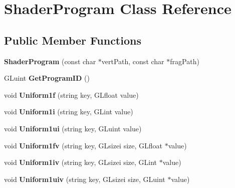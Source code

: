 \hypertarget{class_shader_program}{\section{Shader\-Program Class Reference}
\label{class_shader_program}
}
\subsection*{Public Member Functions}
\begin{DoxyCompactItemize}
\item 
\hypertarget{class_shader_program_af4e64768916420e8b1b25613cbfe87b2}{{\bfseries Shader\-Program} (const char $\ast$vert\-Path, const char $\ast$frag\-Path)}\label{class_shader_program_af4e64768916420e8b1b25613cbfe87b2}

\item 
\hypertarget{class_shader_program_aabcda45c2ffcbc9791b79a809ec07520}{G\-Luint {\bfseries Get\-Program\-I\-D} ()}\label{class_shader_program_aabcda45c2ffcbc9791b79a809ec07520}

\item 
\hypertarget{class_shader_program_abde4a0bc3be5e9417a11836133f7105c}{void {\bfseries Uniform1f} (string key, G\-Lfloat value)}\label{class_shader_program_abde4a0bc3be5e9417a11836133f7105c}

\item 
\hypertarget{class_shader_program_afc30088842f57ca6934a77b67d42d8e8}{void {\bfseries Uniform1i} (string key, G\-Lint value)}\label{class_shader_program_afc30088842f57ca6934a77b67d42d8e8}

\item 
\hypertarget{class_shader_program_ac34c7aaa86f1652b30745a9192724414}{void {\bfseries Uniform1ui} (string key, G\-Luint value)}\label{class_shader_program_ac34c7aaa86f1652b30745a9192724414}

\item 
\hypertarget{class_shader_program_a31956592c743f49f16c86fb79ba1e7e8}{void {\bfseries Uniform1fv} (string key, G\-Lsizei size, G\-Lfloat $\ast$value)}\label{class_shader_program_a31956592c743f49f16c86fb79ba1e7e8}

\item 
\hypertarget{class_shader_program_a9920358f097608d437caee180ef97e26}{void {\bfseries Uniform1iv} (string key, G\-Lsizei size, G\-Lint $\ast$value)}\label{class_shader_program_a9920358f097608d437caee180ef97e26}

\item 
\hypertarget{class_shader_program_a37305abee09777350e104b00edf6da3a}{void {\bfseries Uniform1uiv} (string key, G\-Lsizei size, G\-Luint $\ast$value)}\label{class_shader_program_a37305abee09777350e104b00edf6da3a}


\end{DoxyCompactItemize}
